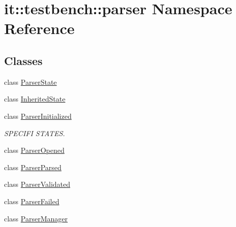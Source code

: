 \hypertarget{namespaceit_1_1testbench_1_1parser}{\section{it\-:\-:testbench\-:\-:parser Namespace Reference}
\label{d8/d49/namespaceit_1_1testbench_1_1parser}
}
\subsection*{Classes}
\begin{DoxyCompactItemize}
\item 
class \hyperlink{classit_1_1testbench_1_1parser_1_1ParserState}{Parser\-State}
\item 
class \hyperlink{classit_1_1testbench_1_1parser_1_1InheritedState}{Inherited\-State}
\item 
class \hyperlink{classit_1_1testbench_1_1parser_1_1ParserInitialized}{Parser\-Initialized}
\begin{DoxyCompactList}\small\item\em S\-P\-E\-C\-I\-F\-I S\-T\-A\-T\-E\-S. \end{DoxyCompactList}\item 
class \hyperlink{classit_1_1testbench_1_1parser_1_1ParserOpened}{Parser\-Opened}
\item 
class \hyperlink{classit_1_1testbench_1_1parser_1_1ParserParsed}{Parser\-Parsed}
\item 
class \hyperlink{classit_1_1testbench_1_1parser_1_1ParserValidated}{Parser\-Validated}
\item 
class \hyperlink{classit_1_1testbench_1_1parser_1_1ParserFailed}{Parser\-Failed}
\item 
class \hyperlink{classit_1_1testbench_1_1parser_1_1ParserManager}{Parser\-Manager}
\end{DoxyCompactItemize}
